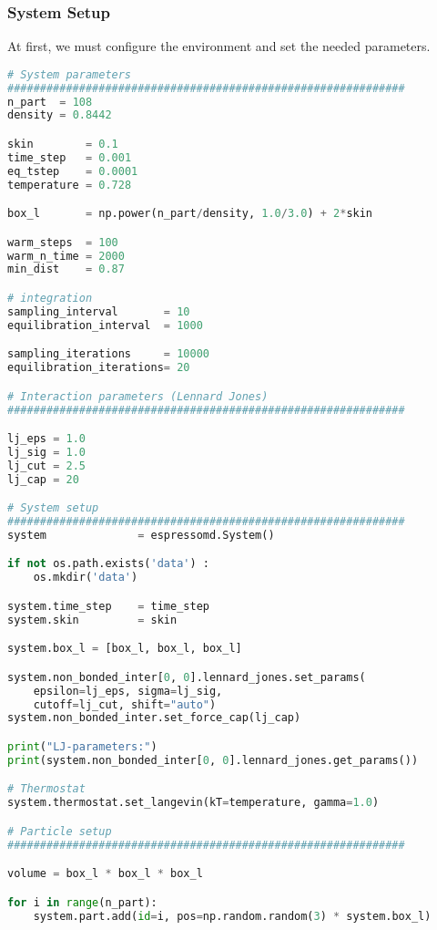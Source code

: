 \documentclass[
paper=a4,                       %
fontsize=11pt,                  %
twoside,                        %
footsepline,                    %
headsepline,                    %
headinclude=false,              %
footinclude=false,              %
pagesize,                       %
]{scrartcl}
\begin{document}
\subsubsection{System Setup}
At first, we must configure the environment and set the needed parameters.
{\small\vspace{0,2cm}
\begin{lstlisting}[language=Python]
# System parameters
#############################################################
n_part  = 108
density = 0.8442

skin        = 0.1
time_step   = 0.001 
eq_tstep    = 0.0001
temperature = 0.728

box_l       = np.power(n_part/density, 1.0/3.0) + 2*skin

warm_steps  = 100
warm_n_time = 2000
min_dist    = 0.87

# integration
sampling_interval       = 10
equilibration_interval  = 1000

sampling_iterations     = 10000
equilibration_iterations= 20

# Interaction parameters (Lennard Jones)
#############################################################

lj_eps = 1.0
lj_sig = 1.0
lj_cut = 2.5
lj_cap = 20

# System setup
#############################################################
system              = espressomd.System()

if not os.path.exists('data') :
    os.mkdir('data')

system.time_step    = time_step
system.skin         = skin

system.box_l = [box_l, box_l, box_l]

system.non_bonded_inter[0, 0].lennard_jones.set_params(
    epsilon=lj_eps, sigma=lj_sig,
    cutoff=lj_cut, shift="auto")
system.non_bonded_inter.set_force_cap(lj_cap)

print("LJ-parameters:")
print(system.non_bonded_inter[0, 0].lennard_jones.get_params())

# Thermostat
system.thermostat.set_langevin(kT=temperature, gamma=1.0)

# Particle setup
#############################################################

volume = box_l * box_l * box_l

for i in range(n_part):
    system.part.add(id=i, pos=np.random.random(3) * system.box_l)
\end{lstlisting}}\vspace{0,2cm}
\end{document}
